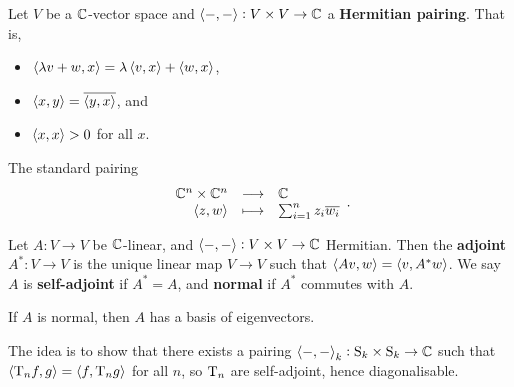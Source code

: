 Let $ V $ be a $ \mathbb{C} $-vector space and $ \left\langle -, - \right\rangle : V \times V \to \mathbb{C} $ a \textbf{Hermitian pairing}. That is,
\begin{itemize}
\item $ \left\langle \lambda v + w, x \right\rangle = \lambda\left\langle v, x \right\rangle + \left\langle w, x \right\rangle $,
\item $ \left\langle x, y \right\rangle = \overline{\left\langle y, x \right\rangle} $, and
\item $ \left\langle x, x \right\rangle > 0 $ for all $ x $.
\end{itemize}

\begin{example*}
The standard pairing
$$ \function{\CC^n \times \CC^n}{\CC}{\abr{z, w}}{\sum_{i = 1}^n z_i\overline{w_i}}. $$
\end{example*}

\begin{definition}
Let $ A : V \to V $ be $ \mathbb{C} $-linear, and $ \left\langle -, - \right\rangle : V \times V \to \mathbb{C} $ Hermitian. Then the \textbf{adjoint} $ A^* : V \to V $ is the unique linear map $ V \to V $ such that $ \left\langle Av, w \right\rangle = \left\langle v, A^*w \right\rangle $. We say $ A $ is \textbf{self-adjoint} if $ A^* = A $, and \textbf{normal} if $ A^* $ commutes with $ A $.
\end{definition}

\begin{theorem}
If $ A $ is normal, then $ A $ has a basis of eigenvectors.
\end{theorem}

The idea is to show that there exists a pairing $ \left\langle -, - \right\rangle_k : \mathrm{S}_k \times \mathrm{S}_k \to \mathbb{C} $ such that $ \left\langle \mathrm{T}_nf, g \right\rangle = \left\langle f, \mathrm{T}_ng \right\rangle $ for all $ n $, so $ \mathrm{T}_n $ are self-adjoint, hence diagonalisable.


